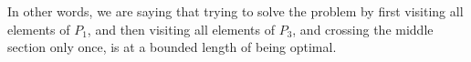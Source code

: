 


In other words, we are saying that trying to solve the problem by first visiting all elements of $P_1$, and then visiting all elements of $P_3$, and crossing the middle section only once, is at a bounded length of being optimal.

